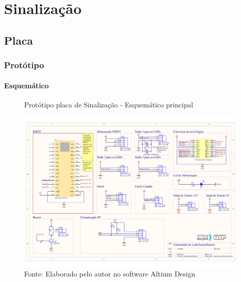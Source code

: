 \documentclass[../delivery_hospital_report.tex]{subfiles}
\begin{document}
\section{Sinalização}
\subsection{Placa}
\subsubsection{Protótipo}

\paragraph{Esquemático}

\begin{figure}[h]
\centering
    \caption{Protótipo placa de Sinalização - Esquemático principal }
    \centering %
    \includegraphics[width=17cm]{modulos/Sinalização-1.png}
    \caption*{Fonte: Elaborado pelo autor no software Altium Design\cite{altium21} }
    \label{Protótipo placa de ## - Esquemático principal}
\end{figure}
\end{document}
